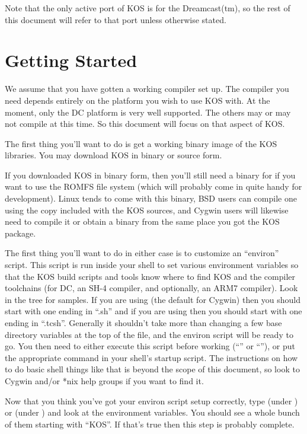 \documentclass[english]{report}
\begin{document}
Note that the only active port of KOS is for the Dreamcast(tm), so
the rest of this document will refer to that port unless otherwise
stated.



\chapter{Getting Started}

We assume that you have gotten a working compiler set up. The compiler
you need depends entirely on the platform you wish to use KOS with.
At the moment, only the DC platform is very well supported. The others
may or may not compile at this time. So this document will focus on
that aspect of KOS.

The first thing you'll want to do is get a working binary image of
the KOS libraries. You may download KOS in binary or source form.

If you downloaded KOS in binary form, then you'll still need a binary
for  if you want to use the ROMFS file system (which
will probably come in quite handy for development). Linux tends to
come with this binary, BSD users can compile one using the copy included
with the KOS sources, and Cygwin users will likewise need to compile
it or obtain a binary from the same place you got the KOS package.

The first thing you'll want to do in either case is to customize an
``environ'' script. This script is run inside your shell to set
various environment variables so that the KOS build scripts and tools
know where to find KOS and the compiler toolchains (for DC, an SH-4
compiler, and optionally, an ARM7 compiler). Look in the 
tree for samples. If you are using  (the default
for Cygwin) then you should start with one ending in ``.sh'' and
if you are using  then you should start with one ending
in ``.tcsh''. Generally it shouldn't take more than changing a
few base directory variables at the top of the file, and the environ
script will be ready to go. You then need to either execute this script
before working (``'' or ``''),
or put the appropriate command in your shell's startup script. The
instructions on how to do basic shell things like that is beyond the
scope of this document, so look to Cygwin and/or {*}nix help groups
if you want to find it.

Now that you think you've got your environ script setup correctly,
type  (under ) or  (under
) and look at the environment variables. You should see
a whole bunch of them starting with ``KOS''. If that's true then
this step is probably complete.
\end{document}
